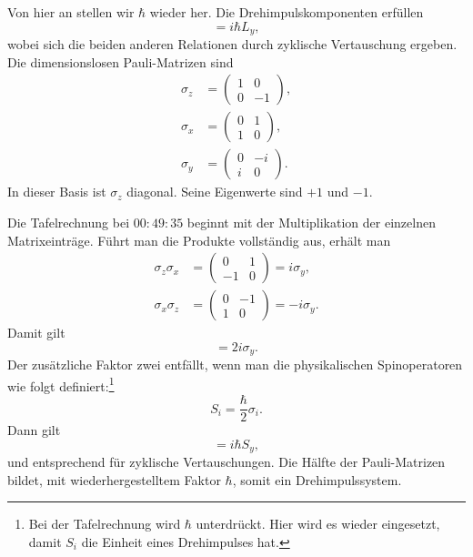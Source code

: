 Von hier an stellen wir \(\hbar\) wieder her. Die Drehimpulskomponenten erfüllen
\begin{equation}
[L_{z},L_{x}]=i\hbar L_{y},
\end{equation}
wobei sich die beiden anderen Relationen durch zyklische Vertauschung ergeben. Die dimensionslosen Pauli-Matrizen sind
\begin{equation}
\begin{aligned}
\sigma_{z}&=
\begin{pmatrix}
1&0\\
0&-1
\end{pmatrix},\\[0.4em]
\sigma_{x}&=
\begin{pmatrix}
0&1\\
1&0
\end{pmatrix},\\[0.4em]
\sigma_{y}&=
\begin{pmatrix}
0&-i\\
i&0
\end{pmatrix}.
\end{aligned}
\end{equation}
In dieser Basis ist \(\sigma_{z}\) diagonal. Seine Eigenwerte sind \(+1\) und
\(-1\).

\begin{classroomqa}
\end{classroomqa}

Die Tafelrechnung bei \(00{:}49{:}35\) beginnt mit der Multiplikation der einzelnen Matrixeinträge. Führt man die Produkte vollständig aus, erhält man
\begin{align}
\sigma_{z}\sigma_{x}
&=
\begin{pmatrix}
0&1\\
-1&0
\end{pmatrix}
=i\sigma_{y},\\
\sigma_{x}\sigma_{z}
&=
\begin{pmatrix}
0&-1\\
1&0
\end{pmatrix}
=-i\sigma_{y}.
\end{align}
Damit gilt
\begin{equation}
[\sigma_{z},\sigma_{x}]=2i\sigma_{y}.
\end{equation}
Der zusätzliche Faktor zwei entfällt, wenn man die physikalischen Spinoperatoren wie folgt definiert:\footnote{Bei der Tafelrechnung wird \(\hbar\) unterdrückt. Hier wird es wieder eingesetzt, damit \(S_i\) die Einheit eines Drehimpulses hat.}
\begin{equation}
S_{i}=\frac{\hbar}{2}\sigma_{i}.
\end{equation}
Dann gilt
\begin{equation}
[S_{z},S_{x}]=i\hbar S_{y},
\end{equation}
und entsprechend für zyklische Vertauschungen. Die Hälfte der Pauli-Matrizen bildet, mit wiederhergestelltem Faktor \(\hbar\), somit ein Drehimpulssystem.

